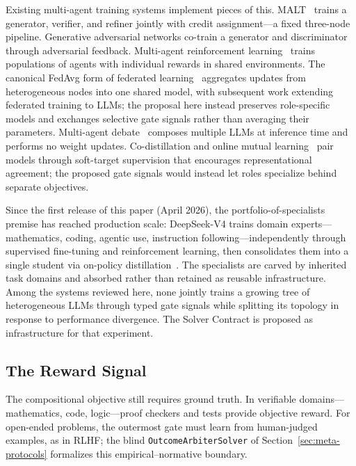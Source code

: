 \documentclass[11pt]{article}
\let\oldtexttt\texttt
\renewcommand{\texttt}[1]{\oldtexttt{\small #1}}
\begin{document}
Existing multi-agent training systems implement pieces of this. MALT~\cite{MALT2024} trains a generator, verifier, and refiner jointly with credit assignment---a fixed three-node pipeline. Generative adversarial networks co-train a generator and discriminator through adversarial feedback. Multi-agent reinforcement learning~\cite{lowe2017maddpg,sukhbaatar2016commnet} trains populations of agents with individual rewards in shared environments. The canonical FedAvg form of federated learning~\cite{mcmahan2017federated} aggregates updates from heterogeneous nodes into one shared model, with subsequent work extending federated training to LLMs; the proposal here instead preserves role-specific models and exchanges selective gate signals rather than averaging their parameters. Multi-agent debate~\cite{du2024multiagent,liang2024mad} composes multiple LLMs at inference time and performs no weight updates. Co-distillation and online mutual learning~\cite{anil2018codistillation,zhang2018mutual} pair models through soft-target supervision that encourages representational agreement; the proposed gate signals would instead let roles specialize behind separate objectives.

Since the first release of this paper (April 2026), the
portfolio-of-specialists premise has reached production scale: DeepSeek-V4
trains domain experts---mathematics, coding, agentic use, instruction
following---independently through supervised fine-tuning and reinforcement
learning, then consolidates them into a single student via on-policy
distillation~\cite{deepseek2026v4}. The specialists are carved by inherited
task domains and absorbed rather than retained as reusable infrastructure.
Among the systems reviewed here, none jointly trains a growing tree of heterogeneous LLMs through typed gate signals while splitting its topology in response to performance divergence. The Solver Contract is proposed as infrastructure for that experiment.

\subsection{The Reward Signal}

The compositional objective still requires ground truth. In verifiable domains---mathematics, code, logic---proof checkers and tests provide objective reward. For open-ended problems, the outermost gate must learn from human-judged examples, as in RLHF; the blind \texttt{OutcomeArbiterSolver} of Section~\ref{sec:meta-protocols} formalizes this empirical--normative boundary.
\end{document}
